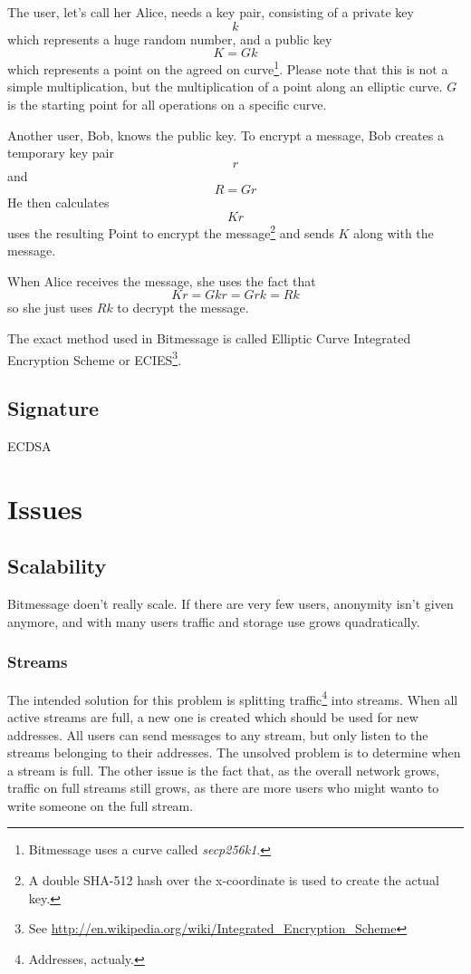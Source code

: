 \documentclass{bfh}
\begin{document}
  The user, let's call her Alice, needs a key pair, consisting of a private key
$$k$$
which represents a huge random number, and a public key
$$K = G k$$
which represents a point on the agreed on curve\footnote{Bitmessage uses a curve called \textit{secp256k1}.}. Please note that this is not a simple multiplication, but the multiplication of a point along an elliptic curve. $G$ is the starting point for all operations on a specific curve.

  Another user, Bob, knows the public key. To encrypt a message, Bob creates a temporary key pair
$$r$$
and
$$R = G r$$
He then calculates
$$K r$$
uses the resulting Point to encrypt the message\footnote{A double SHA-512 hash over the x-coordinate is used to create the actual key.} and sends $K$ along with the message.

  When Alice receives the message, she uses the fact that
$$K r = G k r = G r k = R k$$
so she just uses $R k$ to decrypt the message.

  The exact method used in Bitmessage is called Elliptic Curve Integrated Encryption Scheme or ECIES\footnote{See \url{http://en.wikipedia.org/wiki/Integrated_Encryption_Scheme}}.

  \subsection{Signature}

ECDSA

  \section{Issues}

  \subsection{Scalability}

  Bitmessage doen't really scale. If there are very few users, anonymity isn't given anymore, and with many users traffic and storage use grows quadratically.

  \subsubsection{Streams}
  The intended solution for this problem is splitting traffic\footnote{Addresses, actualy.} into streams. When all active streams are full, a new one is created which should be used for new addresses. All users can send messages to any stream, but only listen to the streams belonging to their addresses. The unsolved problem is to determine when a stream is full. The other issue is the fact that, as the overall network grows, traffic on full streams still grows, as there are more users who might wanto to write someone on the full stream.
\end{document}

